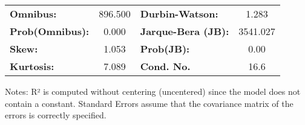 \begin{center}
\begin{tabular}{lcccccc}
\bottomrule
\end{tabular}
\begin{tabular}{lclc}
\textbf{Omnibus:}       & 896.500 & \textbf{  Durbin-Watson:     } &    1.283  \\
\textbf{Prob(Omnibus):} &   0.000 & \textbf{  Jarque-Bera (JB):  } & 3541.027  \\
\textbf{Skew:}          &   1.053 & \textbf{  Prob(JB):          } &     0.00  \\
\textbf{Kurtosis:}      &   7.089 & \textbf{  Cond. No.          } &     16.6  \\
\bottomrule
\end{tabular}
\end{center}

Notes: \newline
 [1] R² is computed without centering (uncentered) since the model does not contain a constant. \newline
 [2] Standard Errors assume that the covariance matrix of the errors is correctly specified.